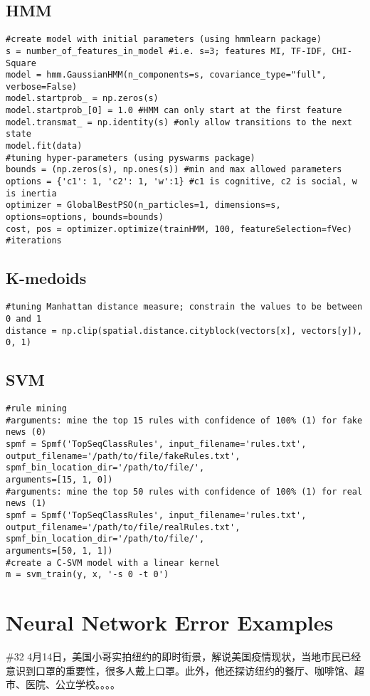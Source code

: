 \documentclass [11pt, proquest] {uwthesis}[2020/02/24]
\begin{document}
\section{HMM}
\begin{verbatim}
#create model with initial parameters (using hmmlearn package)
s = number_of_features_in_model #i.e. s=3; features MI, TF-IDF, CHI-Square
model = hmm.GaussianHMM(n_components=s, covariance_type="full", verbose=False)
model.startprob_ = np.zeros(s) 
model.startprob_[0] = 1.0 #HMM can only start at the first feature
model.transmat_ = np.identity(s) #only allow transitions to the next state
model.fit(data)
#tuning hyper-parameters (using pyswarms package)
bounds = (np.zeros(s), np.ones(s)) #min and max allowed parameters
options = {'c1': 1, 'c2': 1, 'w':1} #c1 is cognitive, c2 is social, w is inertia
optimizer = GlobalBestPSO(n_particles=1, dimensions=s,
options=options, bounds=bounds)
cost, pos = optimizer.optimize(trainHMM, 100, featureSelection=fVec) #iterations
\end{verbatim}
\section{K-medoids}
\begin{verbatim} 
#tuning Manhattan distance measure; constrain the values to be between 0 and 1
distance = np.clip(spatial.distance.cityblock(vectors[x], vectors[y]), 0, 1) 
\end{verbatim}
\section{SVM}
\begin{verbatim}
#rule mining
#arguments: mine the top 15 rules with confidence of 100% (1) for fake news (0)
spmf = Spmf('TopSeqClassRules', input_filename='rules.txt', 
output_filename='/path/to/file/fakeRules.txt',
spmf_bin_location_dir='/path/to/file/', 
arguments=[15, 1, 0])
#arguments: mine the top 50 rules with confidence of 100% (1) for real news (1)
spmf = Spmf('TopSeqClassRules', input_filename='rules.txt', 
output_filename='/path/to/file/realRules.txt',
spmf_bin_location_dir='/path/to/file/', 
arguments=[50, 1, 1])
#create a C-SVM model with a linear kernel
m = svm_train(y, x, '-s 0 -t 0') 
\end{verbatim}

\chapter{Neural Network Error Examples}
\begin{CJK*}{UTF8}{gbsn}\#32 4月14日，美国小哥实拍纽约的即时街景，解说美国疫情现状，当地市民已经意识到口罩的重要性，很多人戴上口罩。此外，他还探访纽约的餐厅、咖啡馆、超市、医院、公立学校。。。。\end{CJK*}
\end{document}
